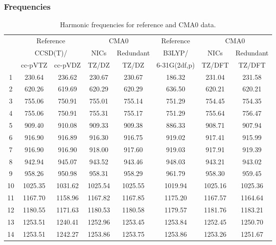 \documentclass[10pt,oneside]{article}
\begin{document}
\begin{table}[h!]
\subsubsection*{Frequencies}
\centering
\caption{Harmonic frequencies for reference and CMA0 data.}
\begin{tabular}{cccccccc}
\toprule
{} & \multicolumn{2}{c}{Reference} & \multicolumn{2}{c}{CMA0} &    Reference & \multicolumn{2}{c}{CMA0} \\
{} & \multicolumn{2}{c}{CCSD(T)/} &    NICs &  Redundant &       B3LYP/ &    NICs & Redundant \\
{} &   cc-pVTZ & cc-pVDZ &   TZ/DZ &      TZ/DZ & 6-31G(2df,p) &  TZ/DFT &    TZ/DFT \\
\midrule
1  &    230.64 &  236.62 &  230.67 &     230.67 &       186.32 &  231.04 &    231.58 \\
2  &    620.26 &  619.69 &  620.29 &     620.29 &       636.50 &  620.21 &    620.21 \\
3  &    755.06 &  750.91 &  755.01 &     755.14 &       751.29 &  754.45 &    754.35 \\
4  &    755.06 &  750.91 &  755.31 &     755.17 &       751.29 &  755.64 &    756.47 \\
5  &    909.40 &  910.08 &  909.33 &     909.38 &       886.33 &  908.71 &    907.94 \\
6  &    916.90 &  916.89 &  916.30 &     916.75 &       919.02 &  917.41 &    915.99 \\
7  &    916.90 &  916.90 &  918.00 &     917.60 &       919.03 &  917.91 &    919.39 \\
8  &    942.94 &  945.07 &  943.52 &     943.46 &       948.03 &  943.21 &    943.02 \\
9  &    958.26 &  950.98 &  958.31 &     958.29 &       961.79 &  958.30 &    959.45 \\
10 &   1025.35 & 1031.62 & 1025.54 &    1025.55 &      1019.94 & 1025.16 &   1025.36 \\
11 &   1167.70 & 1158.96 & 1167.82 &    1167.85 &      1175.20 & 1167.57 &   1164.64 \\
12 &   1180.55 & 1171.63 & 1180.53 &    1180.58 &      1179.57 & 1181.76 &   1183.21 \\
13 &   1253.51 & 1240.41 & 1252.96 &    1253.45 &      1253.84 & 1252.45 &   1250.70 \\
14 &   1253.51 & 1242.27 & 1253.86 &    1253.75 &      1253.86 & 1253.26 &   1251.67 \\

\end{tabular}
\end{table}
\end{document}

